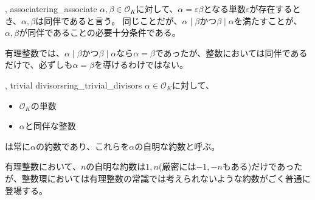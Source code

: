 \begin{Defi}{, associate}{ring_associate}
$\alpha,\beta\in\mathcal{O}_K$に対して、$\alpha=\varepsilon\beta$となる単数$\varepsilon$が存在するとき、$\alpha,\beta$は同伴であると言う。
同じことだが、$\alpha \mid \beta$かつ$\beta \mid \alpha$を満たすことが、$\alpha,\beta$が同伴であることの必要十分条件である。
\end{Defi}

有理整数では、$\alpha \mid \beta$かつ$\beta \mid \alpha$なら$\alpha=\beta$であったが、整数においては同伴であるだけで、必ずしも$\alpha=\beta$を導けるわけではない。

\begin{Defi}{, trivial divisors}{ring_trivial_divisors}
$\alpha\in\mathcal{O}_K$に対して、
\begin{itemize}
 \item $\mathcal{O}_K$の単数
 \item $\alpha$と同伴な整数
\end{itemize}
は常に$\alpha$の約数であり、これらを$\alpha$の自明な約数と呼ぶ。
\end{Defi}

有理整数において、$n$の自明な約数は$1,n$(厳密には$-1,-n$もある)だけであったが、整数環においては有理整数の常識では考えられないような約数がごく普通に登場する。

